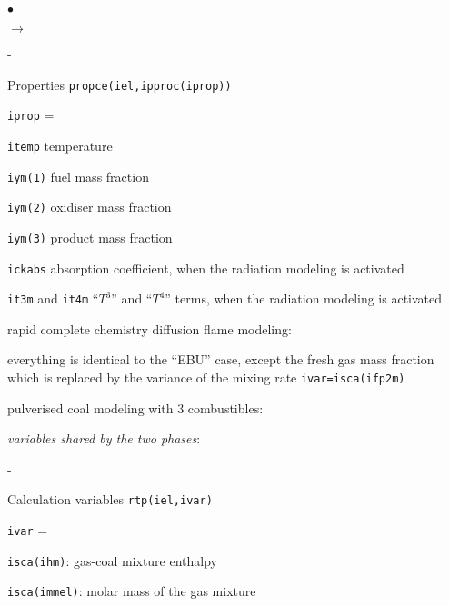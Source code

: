 {{\begin{list}{$\bullet$}{}
\begin{list}{$\rightarrow$}{}
\begin{list}{-}{}
        \item Properties \texttt{propce(iel,ipproc(iprop))}
              \begin{list}{\texttt{iprop} = }{}
               \item \texttt{itemp} temperature
               \item \texttt{iym(1)} fuel mass fraction
               \item \texttt{iym(2)} oxidiser mass fraction
               \item \texttt{iym(3)} product mass fraction
               \item \texttt{ickabs} absorption
                     coefficient, when the radiation modeling is
                     activated
               \item \texttt{it3m} and \texttt{it4m}
                     ``$T^3$'' and ``$T^4$'' terms, when the radiation
                     modeling is activated
              \end{list}
       \end{list}
       \item rapid complete chemistry diffusion flame modeling:
             \begin{list}{}{}
              \item  everything is identical to the ``EBU'' case, except
                     the fresh gas mass fraction which is replaced by the
                     variance of the mixing rate \texttt{ivar=isca(ifp2m)}
             \end{list}
       \item pulverised coal modeling with 3 combustibles:
             \begin{list}{}{}
              \item {\em variables shared by the two phases}:
                    \begin{list}{-}{}
                     \item Calculation variables \texttt{rtp(iel,ivar)}
                           \begin{list}{\texttt{ivar} = }{}
                            \item \texttt{isca(ihm)}: gas-coal mixture enthalpy
                            \item \texttt{isca(immel)}: molar mass of the
                                  gas mixture
                           \end{list}

\end{list}
\end{list}
\end{list}
\end{list}}}
